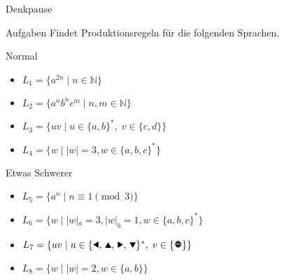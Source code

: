 {
\begin{frame}{Denkpause}
    \begin{alertblock}{Aufgaben}
    Findet Produktionsregeln für die folgenden Sprachen.
    \end{alertblock}
    \begin{block}{Normal}
    \begin{itemize}
        \item $L_1 = \{a^{2n}\;|\;n\in\mathbb{N}\}$
        \item $L_2 = \{a^nb^nc^m\;|\;n, m\in\mathbb{N}\}$
        \item $L_3 = \{uv\;|\;u\in\{a,b\}^\ast,\;v\in\{c,d\}\}$
        \item $L_4 = \{w\;|\;|w| = 3, w\in \{a,b,c\}^*\}$
    \end{itemize}
    \end{block}
    \begin{block}{Etwas Schwerer}
    \begin{itemize}
        \item $L_5 = \{a^n\;|\;n \equiv 1 \pmod 3\}$
        \item $L_6 = \{w\;|\;|w|_a = 3, |w|_b = 1, w\in \{a,b,c\}^*\}$
        \item $L_7 = \{uv\;|\;u\in\{\text{\Rewind, \MoveUp, \Forward, \MoveDown}\}^\ast,\;v\in\{\text{\Stopsign}\}\}$
        \item $L_8 = \{w\mid |w|=2, w \in \{a, b\}\}$
    \end{itemize}
    \end{block}
\end{frame}
}

